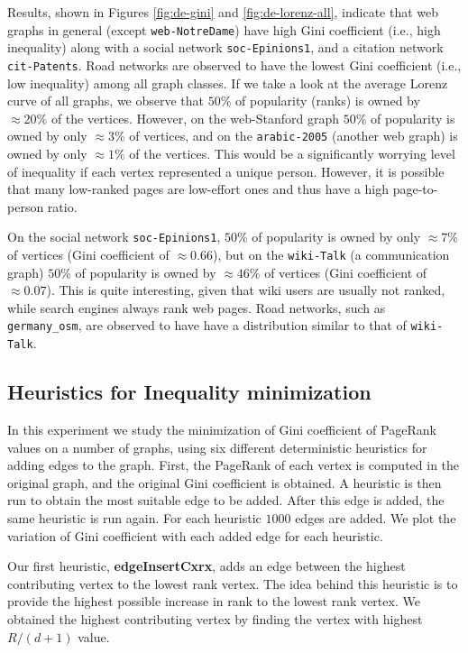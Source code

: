 Results, shown in Figures \ref{fig:de-gini} and \ref{fig:de-lorenz-all}, indicate that web graphs in general (except \verb|web-NotreDame|) have high Gini coefficient (i.e., high inequality) along with a social network \verb|soc-Epinions1|, and a citation network \verb|cit-Patents|. Road networks are observed to have the lowest Gini coefficient (i.e., low inequality) among all graph classes. If we take a look at the average Lorenz curve of all graphs, we observe that $50\%$ of popularity (ranks) is owned by $\approx20\%$ of the vertices. However, on the web-Stanford graph $50\%$ of popularity is owned by only $\approx3\%$ of vertices, and on the \verb|arabic-2005| (another web graph) is owned by only $\approx1\%$ of the vertices. This would be a significantly worrying level of inequality if each vertex represented a unique person. However, it is possible that many low-ranked pages are low-effort ones and thus have a high page-to-person ratio.

On the social network \verb|soc-Epinions1|, $50\%$ of popularity is owned by only $\approx7\%$ of vertices (Gini coefficient of $\approx0.66$), but on the \verb|wiki-Talk| (a communication graph) $50\%$ of popularity is owned by $\approx46\%$ of vertices (Gini coefficient of $\approx0.07$). This is quite interesting, given that wiki users are usually not ranked, while search engines always rank web pages. Road networks, such as \verb|germany_osm|, are observed to have have a distribution similar to that of \verb|wiki-Talk|.




\subsection{Heuristics for Inequality minimization}

In this experiment we study the minimization of Gini coefficient of PageRank values on a number of graphs, using six different deterministic heuristics for adding edges to the graph. First, the PageRank of each vertex is computed in the original graph, and the original Gini coefficient is obtained. A heuristic is then run to obtain the most suitable edge to be added. After this edge is added, the same heuristic is run again. For each heuristic $1000$ edges are added. We plot the variation of Gini coefficient with each added edge for each heuristic.

Our first heuristic, \textbf{edgeInsertCxrx}, adds an edge between the highest contributing vertex to the lowest rank vertex. The idea behind this heuristic is to provide the highest possible increase in rank to the lowest rank vertex. We obtained the highest contributing vertex by finding the vertex with highest $R/(d+1)$ value.

